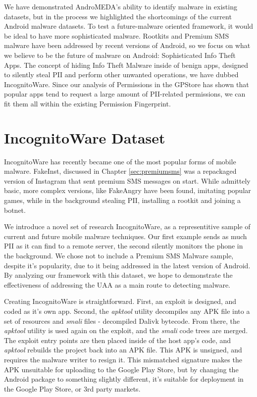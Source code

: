 We have demonstrated AndroMEDA's ability to identify malware in existing datasets, but in the process we highlighted the shortcomings of the current Android malware datasets. To test a future-malware oriented framework, it would be ideal to have more sophisticated malware. Rootkits and Premium SMS malware have been addressed by recent versions of Android, so we focus on what we believe to be the future of malware on Android: Sophisticated Info Theft Apps. The concept of hiding Info Theft Malware inside of benign apps, designed to silently steal PII and perform other unwanted operations, we have dubbed IncognitoWare. Since our analysis of Permissions in the GPStore has shown that popular apps tend to request a large amount of PII-related permissions, we can fit them all within the existing Permission Fingerprint. 

\section{IncognitoWare Dataset}
\label{sec:incognitoware}
IncognitoWare has recently became one of the most popular forms of mobile malware\citep{nq2013}. FakeInst, discussed in Chapter \ref{sec:premiumsms} was a repackaged version of Instagram\citep{instagramandroid} that sent premium SMS messages on start. While admittely basic, more complex versions, like FakeAngry\citep{fakeangry} have been found, imitating popular games, while in the background stealing PII, installing a rootkit and joining a botnet.

We introduce a novel set of research IncognitoWare, as a representitive sample of current and future mobile malware techniques. Our first example sends as much PII as it can find to a remote server, the second silently monitors the phone in the background. We chose not to include a Premium SMS Malware sample, despite it's popularity\citep{nq2013}, due to it being addressed in the latest version of Android. By analyzing our framework with this dataset, we hope to demonstrate the effectiveness of addressing the UAA as a main route to detecting malware.

Creating IncognitoWare is straightforward. First, an exploit is designed, and coded as it's own app. Second, the \textit{apktool}\citep{apktool} utility decompiles any APK file into a set of resources and \textit{smali} files - decompiled Dalivk bytecode. From there, the \textit{apktool} utility is used again on the exploit, and the \textit{smali} code trees are merged. The exploit entry points are then placed inside of the host app's code, and \textit{apktool} rebuilds the project back into an APK file. This APK is unsigned, and requires the malware writer to resign it. This mismatched signature makes the APK unsuitable for uploading to the Google Play Store, but by changing the Android package to something slightly different, it's suitable for deployment in the Google Play Store, or 3rd party markets.


